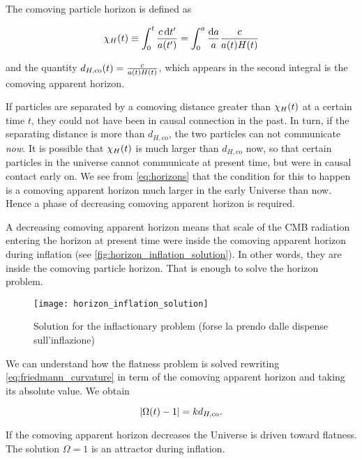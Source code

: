 The comoving particle horizon is defined as

\begin{equation}
        \chi_H\qty(t) \equiv \int^t_0 \frac{c\dd{t'}}{a\qty(t')} =
        \int^a_0 \frac{\dd{a}}{a} \frac{c}{a\qty(t) H\qty(t)}
        \label{eq:horizons}
\end{equation}

and the quantity $d_{H,\text{co}}\qty(t) = \frac{c}{a\qty(t)H\qty(t)}$, which
appears in the second integral is the comoving apparent horizon.

If particles are separated by a comoving distance greater than
$\chi_H\qty(t)$ at a certain time $t$, they could not have been in causal
connection in the past. In turn, if the separating distance is more than
$d_{H,\text{co}}$, the two particles can not communicate \emph{now}. It is
possible that $\chi_H\qty(t)$ is much larger than $d_{H,\text{co}}$ now,
so that certain particles in the universe cannot communicate at present
time, but were in causal contact early on. We see from \autoref{eq:horizons}
that the condition for this to happen is a comoving apparent horizon much larger
in the early Universe than now. Hence a phase of decreasing comoving
apparent horizon is required.

A decreasing comoving apparent horizon means that scale of the CMB
radiation entering the horizon at present time were inside the comoving
apparent horizon during inflation (see \autoref{fig:horizon_inflation_solution}).
In other words, they are inside the comoving particle horizon. That is
enough to solve the horizon problem.

\begin{figure}
        \centering
        \texttt{[image: horizon\_inflation\_solution]}
        \caption{Solution for the inflactionary problem (forse la prendo
        dalle dispense sull'inflazione)}
        \label{fig:horizon_inflation_solution}
\end{figure}


We can understand how the flatness problem is solved rewriting
\autoref{eq:friedmann_curvature} in term of the comoving apparent horizon
and taking its absolute value.  We obtain

\begin{equation}
        \abs{\Omega\qty(t) - 1} = k d_{H,\text{co}}.
\end{equation}

If the comoving apparent horizon decreases the Universe is driven toward
flatness. The solution $\Omega = 1$ is an attractor during inflation.

